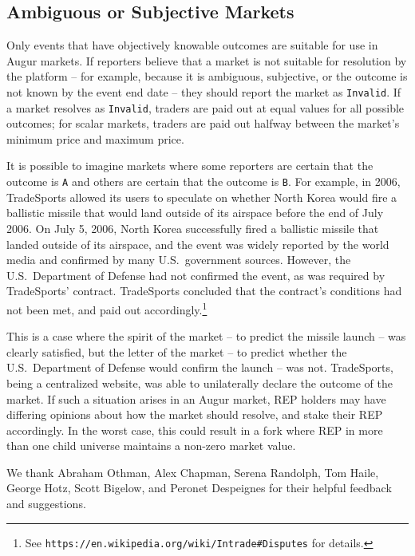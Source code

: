 \documentclass[floatfix,reprint,nofootinbib,amsmath,amssymb,epsfig,pre,floats,letterpaper,groupedaffiliation]{revtex4-1}
\theoremstyle{definition}
\theoremstyle{definition}
\begin{document}
\subsection{Ambiguous or Subjective Markets}\label{section:ambiguous_or_subjective_markets}

Only events that have objectively knowable outcomes are suitable for use in Augur markets.  If reporters believe that a market is not suitable for resolution by the platform -- for example, because it is ambiguous, subjective, or the outcome is not known by the event end date -- they should report the market as \texttt{Invalid}.  If a market resolves as \texttt{Invalid}, traders are paid out at equal values for all possible outcomes; for scalar markets, traders are paid out halfway between the market's minimum price and maximum price.

It is possible to imagine markets where some reporters are certain that the outcome is \texttt{A} and others are certain that the outcome is \texttt{B}.  For example, in 2006, TradeSports allowed its users to speculate on whether North Korea would fire a ballistic missile that would land outside of its airspace before the end of July 2006.  On July 5, 2006, North Korea successfully fired a ballistic missile that landed outside of its airspace, and the event was widely reported by the world media and confirmed by many U.S.~government sources.  However, the U.S.~Department of Defense had not confirmed the event, as was required by TradeSports' contract.  TradeSports concluded that the contract's conditions had not been met, and paid out accordingly.\footnote{See \texttt{https://en.wikipedia.org/wiki/Intrade\#Disputes} for details.}

This is a case where the spirit of the market -- to predict the missile launch -- was clearly satisfied, but the letter of the market -- to predict whether the U.S.~Department of Defense would confirm the launch -- was not.  TradeSports, being a centralized website, was able to unilaterally declare the outcome of the market.  If such a situation arises in an Augur market, REP holders may have differing opinions about how the market should resolve, and stake their REP accordingly.  In the worst case, this could result in a fork where REP in more than one child universe maintains a non-zero market value.

\begin{acknowledgments}\label{section:acknowledgements}
We thank Abraham Othman, Alex Chapman, Serena Randolph, Tom Haile, George Hotz, Scott Bigelow, and Peronet Despeignes for their helpful feedback and suggestions.
\end{acknowledgments}
\end{document}
